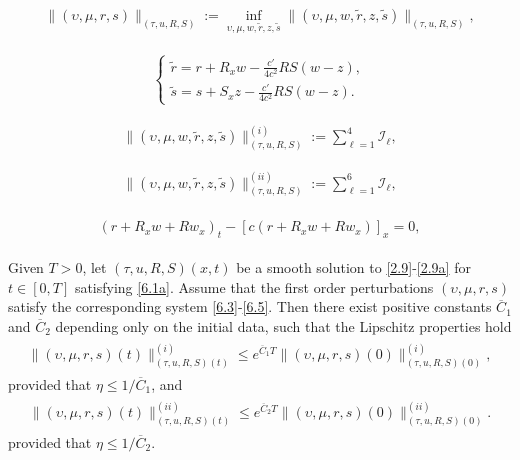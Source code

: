 \documentclass[10pt,a4paper]{amsart}
\newcommand{\dps}{\displaystyle}
\newcommand{\fr}{\frac}
\begin{document}
\begin{align}\label{6.15}
\|(\upsilon, \mu, r, s)\|_{(\tau, u, R, S)}:=\inf_{\upsilon, \mu, w, \tilde{r}, z, \tilde{s}}\|(\upsilon, \mu, w, \tilde{r}, z, \tilde{s})\|_{(\tau, u, R, S)},
\end{align}

\begin{align}\label{6.16}
\left\{
\begin{array}{l}
\dps \tilde{r}=r+R_x w-\fr{c'}{4c^2}RS(w-z),\\[12pt]
\dps \tilde{s}=s+S_x z-\fr{c'}{4c^2}RS(w-z).
\end{array}
\right.
\end{align}

\begin{align}\label{6.17a}
\|(\upsilon, \mu, w, \tilde{r}, z, \tilde{s})\|_{(\tau, u, R, S)}^{(i)}:=\sum_{\ell=1}^4\mathcal{I}_\ell,
\end{align}

\begin{align}\label{6.17}
\|(\upsilon, \mu, w, \tilde{r}, z, \tilde{s})\|_{(\tau, u, R, S)}^{(ii)}:=\sum_{\ell=1}^6\mathcal{I}_\ell,
\end{align}

\begin{align}\label{6.21}
\begin{split}
(r+R_x w+Rw_x)_t-[c(r+R_x w+Rw_x)]_x=0,
\end{split}
\end{align}

\begin{lem}\label{lem6}
Given $T>0$, let $(\tau, u, R, S)(x,t)$ be a smooth solution to \eqref{2.9}-\eqref{2.9a} for $t\in[0,T]$ satisfying \eqref{6.1a}. Assume that the first order perturbations $(\upsilon, \mu, r, s)$ satisfy the corresponding system \eqref{6.3}-\eqref{6.5}. Then there exist positive constants $\overline{C}_1$ and $\overline{C}_2$ depending only on the initial data, such that the Lipschitz properties hold
\begin{align}\label{6.22a}
\begin{split}
\|(\upsilon, \mu, r, s)(t)\|_{(\tau, u, R, S)(t)}^{(i)}\leq e^{\overline{C}_1T}\|(\upsilon, \mu, r, s)(0)\|_{(\tau, u, R, S)(0)}^{(i)},
\end{split}
\end{align}
provided that $\eta\leq 1/\overline{C}_1$, and
\begin{align}\label{6.22}
\begin{split}
\|(\upsilon, \mu, r, s)(t)\|_{(\tau, u, R, S)(t)}^{(ii)}\leq e^{\overline{C}_2T}\|(\upsilon, \mu, r, s)(0)\|_{(\tau, u, R, S)(0)}^{(ii)}.
\end{split}
\end{align}
provided that $\eta\leq 1/\overline{C}_2$.
\end{lem}
\end{document}
